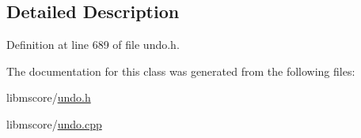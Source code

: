 \subsection{Detailed Description}


Definition at line 689 of file undo.\+h.



The documentation for this class was generated from the following files\+:\begin{DoxyCompactItemize}
\item 
libmscore/\hyperlink{undo_8h}{undo.\+h}\item 
libmscore/\hyperlink{undo_8cpp}{undo.\+cpp}\end{DoxyCompactItemize}
